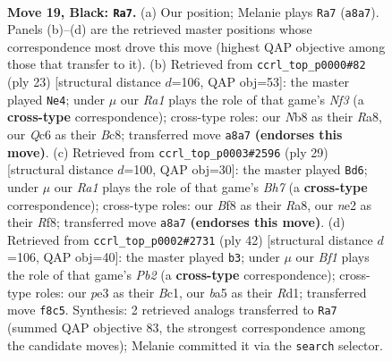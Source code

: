 \documentclass[11pt]{article}
\begin{document}
\clearpage

\begin{figure}[p]\centering
\begin{subfigure}{0.46\textwidth}\centering
\resizebox{\linewidth}{!}{%
\newchessgame
\chessboard[
  setfen={rnr2bk1/1p1b1pp1/p1q1pn2/B6p/7N/3BP3/PP2NPPP/R2QR1K1 b - - 1 19},
  showmover=false,
  pgfstyle=straightmove, color=movearrow, markmove={a8-a7}
]}
\caption{}
\end{subfigure}\hfill
\begin{subfigure}{0.46\textwidth}\centering
\resizebox{\linewidth}{!}{%
\newchessgame
\chessboard[
  setfen={r1bqr1k1/1p2bppp/p1n2n2/3p4/8/1NPBBN1P/PP3PP1/R2Q1RK1 b - - 2 12},
  showmover=false,
  pgfstyle=straightmove, color=movearrow, markmove={f6-e4}
]}
\caption{}
\end{subfigure}
\\[4pt]
\begin{subfigure}{0.46\textwidth}\centering
\resizebox{\linewidth}{!}{%
\newchessgame
\chessboard[
  setfen={r4rk1/ppq1npp1/2n1b2p/3p4/3P3N/3B3P/PP1BNPPb/R2QRK2 b - - 8 15},
  showmover=false,
  pgfstyle=straightmove, color=movearrow, markmove={h2-d6}
]}
\caption{}
\end{subfigure}\hfill
\begin{subfigure}{0.46\textwidth}\centering
\resizebox{\linewidth}{!}{%
\newchessgame
\chessboard[
  setfen={r2qr1k1/1ppb2pp/1n3p2/p3n3/Pb1NP3/6P1/1PQ1NPBP/R1BR2K1 w - - 6 22},
  showmover=false,
  pgfstyle=straightmove, color=movearrow, markmove={b2-b3}
]}
\caption{}
\end{subfigure}
\caption{\textbf{Move 19, Black: \texttt{Ra7}.} (a) Our position; Melanie plays \texttt{Ra7} (\texttt{a8a7}). Panels (b)--(d) are the retrieved master positions whose correspondence most drove this move (highest QAP objective among those that transfer to it). (b) Retrieved from \texttt{ccrl\_top\_p0000\#82} (ply 23) [structural distance $d$=106, QAP obj=53]: the master played \texttt{Ne4}; under $\mu$ our \emph{Ra1} plays the role of that game's \emph{Nf3} (a \textbf{cross-type} correspondence); cross-type roles: our \emph{N}b8 as their \emph{R}a8, our \emph{Q}c6 as their \emph{B}c8; transferred move \texttt{a8a7} \textbf{(endorses this move)}. (c) Retrieved from \texttt{ccrl\_top\_p0003\#2596} (ply 29) [structural distance $d$=100, QAP obj=30]: the master played \texttt{Bd6}; under $\mu$ our \emph{Ra1} plays the role of that game's \emph{Bh7} (a \textbf{cross-type} correspondence); cross-type roles: our \emph{B}f8 as their \emph{R}a8, our \emph{n}e2 as their \emph{R}f8; transferred move \texttt{a8a7} \textbf{(endorses this move)}. (d) Retrieved from \texttt{ccrl\_top\_p0002\#2731} (ply 42) [structural distance $d$=106, QAP obj=40]: the master played \texttt{b3}; under $\mu$ our \emph{Bf1} plays the role of that game's \emph{Pb2} (a \textbf{cross-type} correspondence); cross-type roles: our \emph{p}e3 as their \emph{B}c1, our \emph{b}a5 as their \emph{R}d1; transferred move \texttt{f8c5}. Synthesis: 2 retrieved analogs transferred to \texttt{Ra7} (summed QAP objective 83, the strongest correspondence among the candidate moves); Melanie committed it via the \texttt{search} selector.}
\label{fig:thought-m37}
\end{figure}
\end{document}
